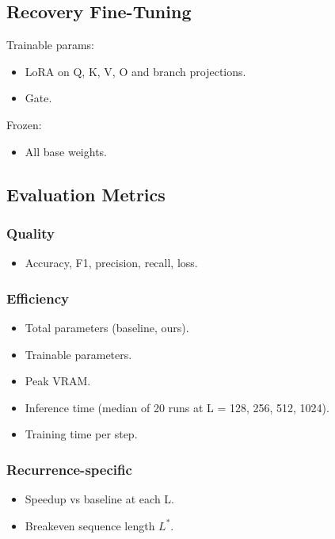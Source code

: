 \subsection{Recovery Fine-Tuning}

Trainable params:
\begin{itemize}
\item LoRA on Q, K, V, O and branch projections.
\item Gate.

\end{itemize}
Frozen:
\begin{itemize}
\item All base weights.

\end{itemize}
\subsection{Evaluation Metrics}

\subsubsection{Quality}
\begin{itemize}
\item Accuracy, F1, precision, recall, loss.

\end{itemize}
\subsubsection{Efficiency}
\begin{itemize}
\item Total parameters (baseline, ours).
\item Trainable parameters.
\item Peak VRAM.
\item Inference time (median of 20 runs at L = 128, 256, 512, 1024).
\item Training time per step.

\end{itemize}
\subsubsection{Recurrence-specific}
\begin{itemize}
\item Speedup vs baseline at each L.
\item Breakeven sequence length $L^*$.

\end{itemize}
